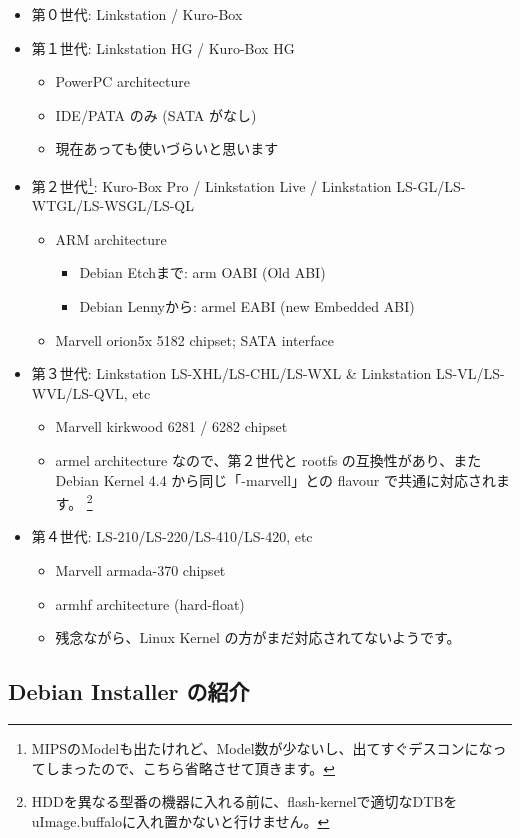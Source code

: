 \documentclass[mingoth,a4paper]{jsarticle}
\begin{document}
\begin{itemize}
\item 第０世代: Linkstation / Kuro-Box
\item 第１世代: Linkstation HG / Kuro-Box HG
	\begin{itemize}
	\item PowerPC architecture
	\item IDE/PATA のみ (SATA がなし)
	\item 現在あっても使いづらいと思います
	\end{itemize}
\item 第２世代\footnote{MIPSのModelも出たけれど、Model数が少ないし、出てすぐデスコンになってしまったので、こちら省略させて頂きます。}: 
Kuro-Box Pro / Linkstation Live / Linkstation LS-GL/LS-WTGL/LS-WSGL/LS-QL
	\begin{itemize}
	\item ARM architecture
		\begin{itemize}
		\item Debian Etchまで: arm OABI (Old ABI)
		\item Debian Lennyから: armel EABI (new Embedded ABI)
		\end{itemize}
	\item Marvell orion5x 5182 chipset; SATA interface
	\end{itemize}
\item 第３世代: Linkstation LS-XHL/LS-CHL/LS-WXL \& Linkstation LS-VL/LS-WVL/LS-QVL, etc
	\begin{itemize}
	\item Marvell kirkwood 6281 / 6282 chipset
	\item armel architecture なので、第２世代と rootfs の互換性があり、また Debian Kernel 4.4 から同じ「-marvell」との flavour で共通に対応されます。
\footnote{HDDを異なる型番の機器に入れる前に、flash-kernelで適切なDTBをuImage.buffaloに入れ置かないと行けません。}
	\end{itemize}
\item 第４世代: LS-210/LS-220/LS-410/LS-420, etc
	\begin{itemize}
	\item Marvell armada-370 chipset
	\item armhf architecture (hard-float)
	\item 残念ながら、Linux Kernel の方がまだ対応されてないようです。
	\end{itemize}
\end{itemize}

\subsection{Debian Installer の紹介}
\end{document}
